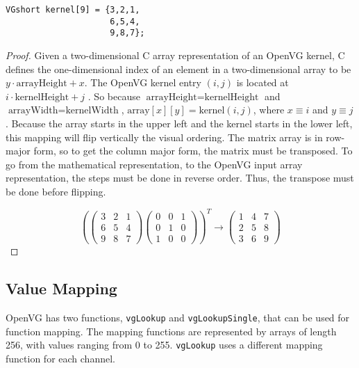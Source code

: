 \documentclass[12pt]{report}
\begin{document}
\begin{lstlisting}
VGshort kernel[9] = {3,2,1,
                     6,5,4,
                     9,8,7};
\end{lstlisting}
\begin{proof}
  Given a two-dimensional C array representation of an OpenVG kernel,
  C defines the one-dimensional index of an element in a
  two-dimensional array to be $y\cdot \text{arrayHeight} + x$. The
  OpenVG kernel entry $(i,j)$ is located at $i\cdot\text{kernelHeight}
  + j$ \cite[p.~178]{openvg}.  So because $\text{arrayHeight} =
  \text{kernelHeight}$ and $\text{arrayWidth} = \text{kernelWidth}$,
  $\text{array}[x][y] = \text{kernel}(i,j)$, where $x\equiv i$ and
  $y\equiv j$.  Because the array starts in the upper left and the
  kernel starts in the lower left, this mapping will flip vertically
  the visual ordering. The matrix array is in row-major form, so to
  get the column major form, the matrix must be transposed. To go from
  the mathematical representation, to the OpenVG input array
  representation, the steps must be done in reverse order. Thus, the
  transpose must be done before flipping.


\[
 \left( \begin{pmatrix} 3 & 2 & 1 \\ 6 & 5 & 4 \\ 9 & 8 & 7 \end{pmatrix}
  \begin{pmatrix} 0 & 0 &
 1 \\ 0 & 1 &
      0 \\ 1 & 0 &
           0 \end{pmatrix} \right)^T \to \begin{pmatrix} 1 & 4 & 7 \\ 2 & 5 & 8 \\ 3 & 6 & 9 \end{pmatrix}
\]
\end{proof}
\subsection{Value Mapping}
\label{sec-3-1-5}
OpenVG has two functions, {\tt vgLookup} and {\tt vgLookupSingle},
that can be used for function mapping. The mapping functions are
represented by arrays of length 256, with values ranging from 0 to
255.  {\tt vgLookup} uses a different mapping function for each
channel.
\end{document}
